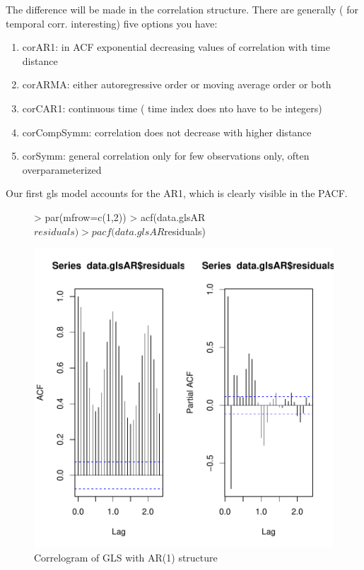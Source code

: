 \documentclass[11pt, a4paper]{article} %
\begin{document}
The difference will be made in the correlation structure. There are generally ( for temporal corr. interesting) five options you have:
\begin{enumerate}
\item corAR1: in ACF exponential decreasing values of correlation with time distance\\
\item corARMA: either autoregressive order or moving average order or both\\
\item corCAR1: continuous time ( time index does nto have to be integers)\\
\item corCompSymm: correlation does not decrease with higher distance\\
\item corSymm: general correlation only for few observations only, often overparameterized\\
\end{enumerate}
Our first gls model accounts for the AR1, which is clearly visible in the PACF.

\begin{figure}[H]
\centering
\begin{Schunk}
\begin{Sinput}
> par(mfrow=c(1,2))
> acf(data.glsAR$residuals)
> pacf(data.glsAR$residuals)
\end{Sinput}
\end{Schunk}
\includegraphics{alleselena-correlogram}
\caption{Correlogram of GLS  with AR(1) structure}
\label{corglsAR}
\end{figure}
\end{document}

